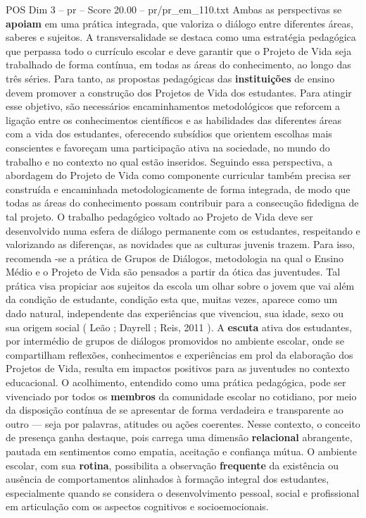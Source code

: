 \begin{textsample}{POS Dim 3 – pr – Score 20.00 – pr/pr\_em\_110.txt}
Ambas as perspectivas se \textbf{apoiam} em uma prática integrada, que valoriza o diálogo entre diferentes áreas, saberes e sujeitos.
A transversalidade se destaca como uma estratégia pedagógica que perpassa todo o currículo escolar e deve garantir que o Projeto de Vida seja trabalhado de forma contínua, em todas as áreas do conhecimento, ao longo das três séries.
Para tanto, as propostas pedagógicas das \textbf{instituições} de ensino devem promover a construção dos Projetos de Vida dos estudantes.
Para atingir esse objetivo, são necessários encaminhamentos metodológicos que reforcem a ligação entre os conhecimentos científicos e as habilidades das diferentes áreas com a vida dos estudantes, oferecendo subsídios que orientem escolhas mais conscientes e favoreçam uma participação ativa na sociedade, no mundo do trabalho e no contexto no qual estão inseridos.
Seguindo essa perspectiva, a abordagem do Projeto de Vida como componente curricular também precisa ser construída e encaminhada metodologicamente de forma integrada, de modo que todas as áreas do conhecimento possam contribuir para a consecução fidedigna de tal projeto.
O trabalho pedagógico voltado ao Projeto de Vida deve ser desenvolvido numa esfera de diálogo permanente com os estudantes, respeitando e valorizando as diferenças, as novidades que as culturas juvenis trazem.
Para isso, recomenda -se a prática de Grupos de Diálogos, metodologia na qual o Ensino Médio e o Projeto de Vida são pensados a partir da ótica das juventudes.
Tal prática visa propiciar aos sujeitos da escola um olhar sobre o jovem que vai além da condição de estudante, condição esta que, muitas vezes, aparece como um dado natural, independente das experiências que vivenciou, sua idade, sexo ou sua origem social ( Leão ; Dayrell ; Reis, 2011 ).
A \textbf{escuta} ativa dos estudantes, por intermédio de grupos de diálogos promovidos no ambiente escolar, onde se compartilham reflexões, conhecimentos e experiências em prol da elaboração dos Projetos de Vida, resulta em impactos positivos para as juventudes no contexto educacional.
O acolhimento, entendido como uma prática pedagógica, pode ser vivenciado por todos os \textbf{membros} da comunidade escolar no cotidiano, por meio da disposição contínua de se apresentar de forma verdadeira e transparente ao outro — seja por palavras, atitudes ou ações coerentes.
Nesse contexto, o conceito de presença ganha destaque, pois carrega uma dimensão \textbf{relacional} abrangente, pautada em sentimentos como empatia, aceitação e confiança mútua.
O ambiente escolar, com sua \textbf{rotina}, possibilita a observação \textbf{frequente} da existência ou ausência de comportamentos alinhados à formação integral dos estudantes, especialmente quando se considera o desenvolvimento pessoal, social e profissional em articulação com os aspectos cognitivos e socioemocionais.

\end{textsample}
